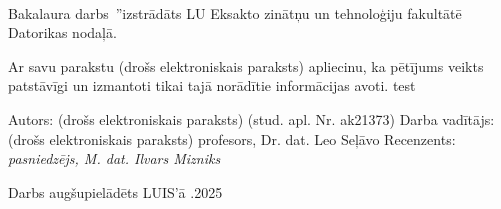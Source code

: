 \documentclass[12pt]{report}%
\theoremstyle{definition}
\def\degree{Bakalaura darbs}
\newcommand{\thedate}[0]{26.05.2025}%
\begin{document}
\cleardoublepage
{}
{}
\printbibliography

%
%


\newpage
\thispagestyle{empty}
\makeatletter
{
\setlength{\parindent}{1cm}
\linespread{1.5}
\selectfont
~\\
\newline

\degree \ \quotedblbase\textit{\@title}\textquotedblright \space izstrādāts LU Eksakto zinātņu un tehnoloģiju fakultātē
Datorikas nodaļā.
\newline

Ar savu parakstu (drošs elektroniskais paraksts) apliecinu, ka pētījums veikts
patstāvīgi un izmantoti tikai tajā norādītie informācijas avoti. test
\newline

Autors: (drošs elektroniskais paraksts) \@author \space (stud. apl. Nr. ak21373)
\newline
\newline
\newline
\newline
Darba vadītājs: (drošs elektroniskais paraksts) profesors, Dr. dat. Leo Seļāvo
\newline
\newline
Recenzents: \textit{pasniedzējs, M. dat. Ilvars Mizniks}
\newline
\newline

Darbs augšupielādēts LUIS’ā \qquad \thedate

}
\makeatother
\end{document}
